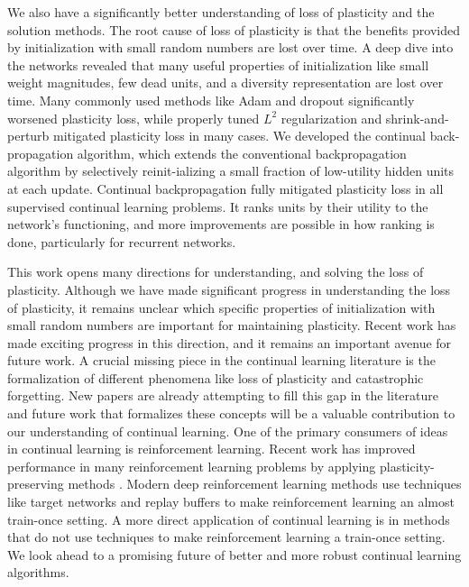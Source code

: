 \documentclass[review, number,3p]{elsarticle}
\begin{document}
We also have a significantly better understanding of loss of plasticity and the solution methods.
The root cause of loss of plasticity is that the benefits provided by initialization with small random numbers are lost over time.
A deep dive into the networks revealed that many useful properties of initialization like small weight magnitudes, few dead units, and a diversity representation are lost over time.
Many commonly used methods like Adam and dropout significantly worsened plasticity loss, while properly tuned $L^2$ regularization and shrink-and-perturb mitigated plasticity loss in many cases.
We developed the continual back-propagation algorithm, which extends the conventional backpropagation algorithm by selectively reinit-ializing a small fraction of low-utility hidden units at each update.
Continual backpropagation fully mitigated plasticity loss in all supervised continual learning problems.
It ranks units by their utility to the network’s functioning, and more improvements are possible in how ranking is done, particularly for recurrent networks.

This work opens many directions for understanding, and solving the loss of plasticity.
Although we have made significant progress in understanding the loss of plasticity, it remains unclear which specific properties of initialization with small random numbers are important for maintaining plasticity.
Recent work \cite{understanding2023, abbas2023loss} has made exciting progress in this direction, and it remains an important avenue for future work.
A crucial missing piece in the continual learning literature is the formalization of different phenomena like loss of plasticity and catastrophic forgetting. 
New papers \cite{kumar2023} are already attempting to fill this gap in the literature and future work that formalizes these concepts will be a valuable contribution to our understanding of continual learning.
One of the primary consumers of ideas in continual learning is reinforcement learning.
Recent work has improved performance in many reinforcement learning problems by applying plasticity-preserving methods \cite{nikishin2023, doro2023, sokar2023, schwarzer2023}.
Modern deep reinforcement learning methods use techniques like target networks and replay buffers to make reinforcement learning an almost train-once setting.
A more direct application of continual learning is in methods that do not use techniques to make reinforcement learning a train-once setting.
We look ahead to a promising future of better and more robust continual learning algorithms.
\end{document}
